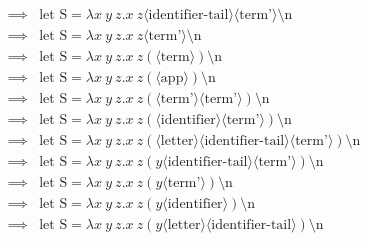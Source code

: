 \documentclass[12pt, a4paper, oneside]{memoir}
\begin{document}
\begin{align*}
    \implies{} & \text{let } \text{S} = \lambda x\ y\ z.x\ z \langle \text{identifier-tail} \rangle \langle \text{term'} \rangle \text{\textbackslash n}                                                       \\
    \implies{} & \text{let } \text{S} = \lambda x\ y\ z.x\ z \langle \text{term'} \rangle \text{\textbackslash n}                                                                                              \\
    \implies{} & \text{let } \text{S} = \lambda x\ y\ z.x\ z (\langle \text{term} \rangle) \text{\textbackslash n}                                                                                             \\
    \implies{} & \text{let } \text{S} = \lambda x\ y\ z.x\ z (\langle \text{app} \rangle) \text{\textbackslash n}                                                                                              \\
    \implies{} & \text{let } \text{S} = \lambda x\ y\ z.x\ z (\langle \text{term'} \rangle \langle \text{term'} \rangle) \text{\textbackslash n}                                                               \\
    \implies{} & \text{let } \text{S} = \lambda x\ y\ z.x\ z (\langle \text{identifier} \rangle \langle \text{term'} \rangle) \text{\textbackslash n}                                                          \\
    \implies{} & \text{let } \text{S} = \lambda x\ y\ z.x\ z (\langle \text{letter} \rangle \langle \text{identifier-tail} \rangle \langle \text{term'} \rangle) \text{\textbackslash n}                       \\
    \implies{} & \text{let } \text{S} = \lambda x\ y\ z.x\ z (y \langle \text{identifier-tail} \rangle \langle \text{term'} \rangle) \text{\textbackslash n}                                                   \\
    \implies{} & \text{let } \text{S} = \lambda x\ y\ z.x\ z (y \langle \text{term'} \rangle) \text{\textbackslash n}                                                                                          \\
    \implies{} & \text{let } \text{S} = \lambda x\ y\ z.x\ z (y \langle \text{identifier} \rangle) \text{\textbackslash n}                                                                                     \\
    \implies{} & \text{let } \text{S} = \lambda x\ y\ z.x\ z (y \langle \text{letter} \rangle \langle \text{identifier-tail} \rangle) \text{\textbackslash n}                                                  \\

\end{align*}
\end{document}
